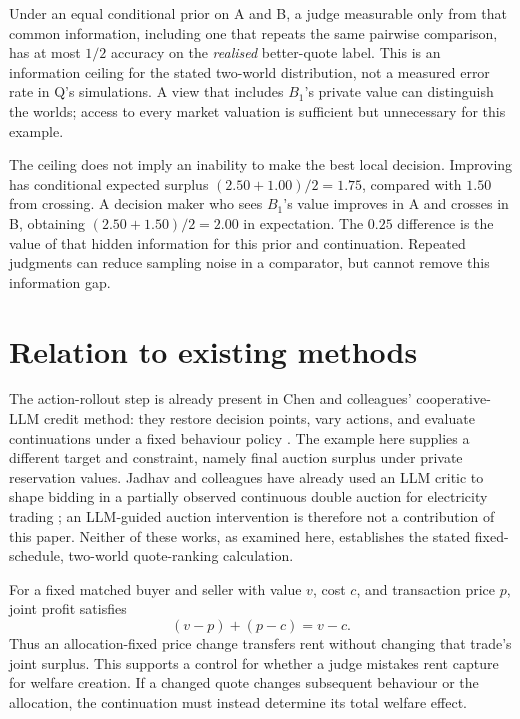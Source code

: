 \documentclass{article}
\begin{document}
Under an equal conditional prior on A and B, a judge measurable only from that common information, including
one that repeats the same pairwise comparison, has at most \(1/2\) accuracy on the \emph{realised}
better-quote label. This is an information ceiling for the stated two-world distribution, not a measured error
rate in Q's simulations. A view that includes \(B_1\)'s private value can distinguish the worlds; access to
every market valuation is sufficient but unnecessary for this example.

The ceiling does not imply an inability to make the best local decision. Improving has conditional expected
surplus \((2.50+1.00)/2=1.75\), compared with \(1.50\) from crossing. A decision maker who sees \(B_1\)'s
value improves in A and crosses in B, obtaining \((2.50+1.50)/2=2.00\) in expectation. The \(0.25\) difference
is the value of that hidden information for this prior and continuation. Repeated judgments can reduce
sampling noise in a comparator, but cannot remove this information gap.

\section{Relation to existing methods}

The action-rollout step is already present in Chen and colleagues' cooperative-LLM credit method: they restore
decision points, vary actions, and evaluate continuations under a fixed behaviour policy \cite{chen2026exact}.
The example here supplies a different target and constraint, namely final auction surplus under private
reservation values. Jadhav and colleagues have already used an LLM critic to shape bidding in a partially
observed continuous double auction for electricity trading \cite{jadhav2025fairness}; an LLM-guided auction
intervention is therefore not a contribution of this paper. Neither of these works, as examined here,
establishes the stated fixed-schedule, two-world quote-ranking calculation.

For a fixed matched buyer and seller with value \(v\), cost \(c\), and transaction price \(p\), joint profit satisfies
\[
(v-p)+(p-c)=v-c.
\]
Thus an allocation-fixed price change transfers rent without changing that trade's joint surplus. This
supports a control for whether a judge mistakes rent capture for welfare creation. If a changed quote changes
subsequent behaviour or the allocation, the continuation must instead determine its total welfare effect.
\end{document}
